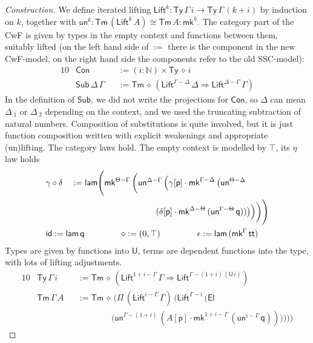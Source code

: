 \documentclass[sigplan,10pt,anonymous,review]{acmart}\settopmatter{printfolios=true,printccs=false,printacmref=false}
\newcommand{\ra}{\rightarrow}
\newcommand{\Ra}{\Rightarrow}
\newcommand{\Ty}{\mathsf{Ty}}
\newcommand{\Tm}{\mathsf{Tm}}
\newcommand{\Con}{\mathsf{Con}}
\newcommand{\Sub}{\mathsf{Sub}}
\newcommand{\p}{\mathsf{p}}
\newcommand{\q}{\mathsf{q}}
\newcommand{\N}{\mathbb{N}}
\newcommand{\lam}{\mathsf{lam}}
\newcommand{\U}{\mathsf{U}}
\newcommand{\El}{\mathsf{El}}
\renewcommand{\tt}{\mathsf{tt}}
\newcommand{\Lift}{\mathsf{Lift}}
\newcommand{\mk}{\mathsf{mk}}
\newcommand{\un}{\mathsf{un}}
\newcommand{\id}{\mathsf{id}}
\begin{document}
\begin{proof}[Construction]
  We define iterated lifting $\Lift^k :
  \Ty\,\Gamma\,i\ra\Ty\,\Gamma\,(k+i)$ by induction on $k$, together
  with $\un^k : \Tm\,(\Lift^k\,A)\cong\Tm\,A : \mk^k$. The category
  part of the CwF is given by types in the empty context and functions
  between them, suitably lifted (on the left hand side of $:=$ there
  is the component in the new CwF-model, on the right hand side the
  components refer to the old SSC-model):
  \begin{alignat*}{10}
    & \Con && := (i:\N)\times\Ty\,\diamond\,i \\
    & \Sub\,\Delta\,\Gamma && := \Tm\,\diamond\,(\Lift^{\Gamma-\Delta}\,\Delta\Ra\Lift^{\Delta-\Gamma}\,\Gamma)
  \end{alignat*}
  In the definition of $\Sub$, we did not write the projections for
  $\Con$, so $\Delta$ can mean $\Delta_{.1}$ or $\Delta_{.2}$
  depending on the context, and we used the truncating subtraction of
  natural numbers. Composition of substitutions is quite involved, but
  it is just function composition written with explicit weakenings and
  appropriate (un)lifting. The category laws hold. The empty context is
  modelled by $\top$, its $\eta$ law holds 
  \begin{alignat*}{10}
    & \gamma\circ\delta && := \lam\Bigg(\mk^{\Theta-\Gamma}\,\bigg(\un^{\Delta-\Gamma}\,\Big(\gamma[\p]\cdot\mk^{\Gamma-\Delta}\,\big(\un^{\Theta-\Delta}\, \\
    & && \hspace{10em}(\delta[\p]\cdot\mk^{\Delta-\Theta}\,(\un^{\Gamma-\Theta}\,\q))\big)\Big)\bigg)\Bigg) \\
    & \rlap{$\id := \lam\,\q \hspace{4.35em} \diamond := (0,\top) \hspace{4.35em} \epsilon := \lam\,(\mk^\Gamma\,\tt)$}
  \end{alignat*}
  Types are given by functions into $\U$, terms are dependent
  functions into the type, with lots of lifting adjustments.
  \begin{alignat*}{10}
    & \Ty\,\Gamma\,i && := \Tm\,\diamond\,(\Lift^{1+i-\Gamma}\,\Gamma\Ra\Lift^{\Gamma-(1+i)\,(\U\,i)}) \\
    & \Tm\,\Gamma\,A && := \Tm\,\diamond\,\Bigg(\Pi\,(\Lift^{i-\Gamma}\,\Gamma)\,\bigg(\Lift^{\Gamma-i}\,\Big(\El\, \\
    & && \hspace{4em} \big(\un^{\Gamma-(1+i)}\,(A[\p]\cdot\mk^{1+i-\Gamma}\,(\un^{i-\Gamma}\,\q))\big)\Big)\bigg)\Bigg)

\end{alignat*}
\end{proof}
\end{document}
